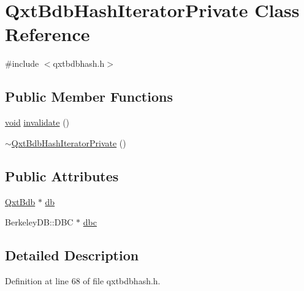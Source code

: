 \hypertarget{class_qxt_bdb_hash_iterator_private}{\section{Qxt\-Bdb\-Hash\-Iterator\-Private Class Reference}
\label{class_qxt_bdb_hash_iterator_private}
}


{\ttfamily \#include $<$qxtbdbhash.\-h$>$}

\subsection*{Public Member Functions}
\begin{DoxyCompactItemize}
\item 
\hyperlink{group___u_a_v_objects_plugin_ga444cf2ff3f0ecbe028adce838d373f5c}{void} \hyperlink{class_qxt_bdb_hash_iterator_private_a94da92336ea437ec7ab89504272fbe0e}{invalidate} ()
\item 
\hyperlink{class_qxt_bdb_hash_iterator_private_a7df45e9126cda3876a33535543181a8c}{$\sim$\-Qxt\-Bdb\-Hash\-Iterator\-Private} ()
\end{DoxyCompactItemize}
\subsection*{Public Attributes}
\begin{DoxyCompactItemize}
\item 
\hyperlink{class_qxt_bdb}{Qxt\-Bdb} $\ast$ \hyperlink{class_qxt_bdb_hash_iterator_private_a9e8dd75f01c318bb00a64f935f3c3317}{db}
\item 
Berkeley\-D\-B\-::\-D\-B\-C $\ast$ \hyperlink{class_qxt_bdb_hash_iterator_private_aa253a0fe03733df052da0903458ed5f8}{dbc}
\end{DoxyCompactItemize}


\subsection{Detailed Description}


Definition at line 68 of file qxtbdbhash.\-h.



